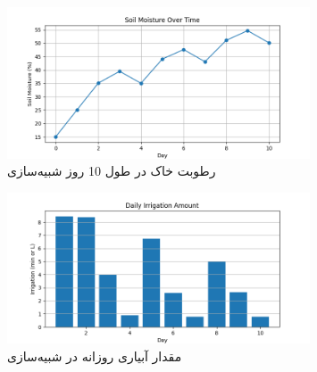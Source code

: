 \documentclass[12pt]{exam}
\begin{document}
	\begin{figure}[h]
		\centering
		\includegraphics[width=0.8\textwidth]{soil_simulation.png}
		\caption{رطوبت خاک در طول 10 روز شبیه‌سازی}
		\label{fig:soil_simulation}
	\end{figure}
	\begin{figure}[h]
		\centering
		\includegraphics[width=0.8\textwidth]{irrigation_simulation.png}
		\caption{مقدار آبیاری روزانه در شبیه‌سازی}
		\label{fig:irrigation_simulation}
	\end{figure}
	
	
\end{document}
